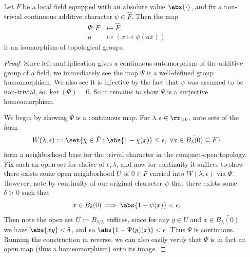 \documentclass[11pt, x11names, openany]{book}
\begin{document}
\begin{theorem}
    \label{thm: self-duality of local fields}
    Let $F$ be a local field equipped with an absolute value $\abs{\cdot}$, and fix a non-trivial continuous additive character $\psi \in \hat{F}$. Then the map
    \begin{align*}
        \Psi: F & \mapsto \hat{F}\\
        a & \mapsto (x \mapsto \psi(ax))
    \end{align*}
    is an isomorphism of topological groups.
\end{theorem}
\begin{proof}
Since left-multiplication gives a continuous automorphism of the additive group of a field, we immediately see the map $\Psi$ is a well-defined group homomorphism. We also see it is injective by the fact that $\psi$ was assumed to be non-trivial, so $\ker(\Psi) = 0$. So it remains to show $\Psi$ is a surjective homeomorphism.

We begin by showing $\Psi$ is a continuous map. For $\lambda, \epsilon \in \rr_{> 0}$, note sets of the form
\begin{equation*}
    W(\lambda, \epsilon) := \set{\chi \in \hat{F} : \abs{1 - \chi(x)} \leq \epsilon, \ \forall x \in \bar{B_{\lambda}(0)} \subseteq F}
\end{equation*}
form a neighborhood base for the trivial character in the compact-open topology. Fix such an open set for choice of $\epsilon, \lambda$, and now for continuity it suffices to show there exists some open neighborhood $U$ of $0 \in F$ carried into $W(\lambda, \epsilon)$ via $\Psi$. However, note by continuity of our original character $\psi$ that there exists some $\delta > 0$ such that 
\begin{equation*}
    x \in B_\delta(0) \implies \abs{1- \psi(x)} < \epsilon.
\end{equation*}
Then note the open set $U := B_{\delta/\lambda}$ suffices, since for any $y \in U$ and $x \in \bar{B_{\lambda}(0)}$ we have $\abs{xy} < \delta$, and so $\abs{1 - \Psi(y)(x)} < \epsilon$. Thus $\Psi$ is continuous. Running the construction in reverse, we can also easily verify that $\Psi$ is in fact an open map (thus a homeomorphism) onto its image.


\end{proof}
\end{document}
